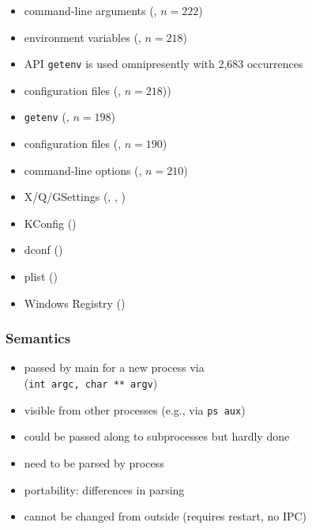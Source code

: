 \begin{frame}
	\methodQuestion{} 
	\begin{itemize}
	\item command-line arguments (, $n=222$)
	\item environment variables (, $n=218$)
	\item \methodSource{} API \texttt{getenv} is used omnipresently with 2,683 occurrences
	\item configuration files (, $n=218$))
	\end{itemize}
\end{frame}


\begin{frame}
	\methodQuestion{} 
	\begin{itemize}
	\item \texttt{getenv} (, $n=198$)
	\item configuration files (, $n=190$)
	\item command-line options (, $n=210$)
	\item X/Q/GSettings (, , )
	\item KConfig ()
	\item dconf ()
	\item plist ()
	\item Windows Registry ()
	\end{itemize}
\end{frame}

\begin{frame}
	\frametitle{Semantics}
	\begin{itemize}
	\item passed by main for a new process via \\ (\texttt{int argc, char ** argv})
	\item visible from other processes (e.g., via \texttt{ps aux})
	\item could be passed along to subprocesses but hardly done
	\item need to be parsed by process
	\item portability: differences in parsing
	\item cannot be changed from outside (requires restart, no IPC)
	\end{itemize}
\end{frame}



